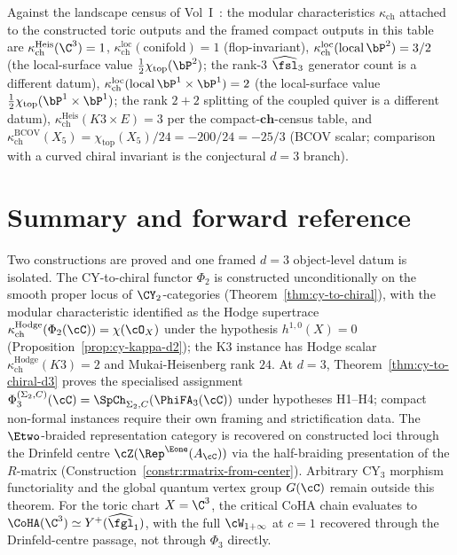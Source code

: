 \begin{remark}
\label{rem:GofX-kappa-consistency}
Against the landscape census of Vol~I~\cite{VolI}: the modular characteristics
$\kappa_{\mathrm{ch}}$ attached to the constructed toric outputs and the
framed compact outputs in this table are
$\kappa_{\mathrm{ch}}^{\mathrm{Heis}}(\C^3) = 1$,
$\kappa_{\mathrm{ch}}^{\mathrm{loc}}(\mathrm{conifold}) = 1$ (flop-invariant),
$\kappa_{\mathrm{ch}}^{\mathrm{loc}}(\mathrm{local}\,\bP^2) = 3/2$ (the local-surface value
$\frac{1}{2}\chi_{\mathrm{top}}(\bP^2)$; the rank-$3$ $\widehat{\fsl}_3$
generator count is a different datum),
$\kappa_{\mathrm{ch}}^{\mathrm{loc}}(\mathrm{local}\,\bP^1 \times \bP^1) = 2$
(the local-surface value
$\frac{1}{2}\chi_{\mathrm{top}}(\bP^1\times\bP^1)$; the rank
$2+2$ splitting of the coupled quiver is a different datum),
$\kappa_{\mathrm{ch}}^{\mathrm{Heis}}(K3 \times E) = 3$ per
the compact-$\mathbf{ch}$-census table, and
$\kappa_{\mathrm{ch}}^{\mathrm{BCOV}}(X_5) = \chi_{\mathrm{top}}(X_5)/24
= -200/24 = -25/3$ (BCOV scalar; comparison with a curved chiral invariant is the conjectural $d=3$ branch).
\end{remark}

\section{Summary and forward reference}
\label{sec:cy-to-chiral-closing}

Two constructions are proved and one framed $d = 3$ object-level datum is isolated. The CY-to-chiral functor $\Phi_2$ is constructed unconditionally on the smooth proper locus of $\CY_2$-categories \textup{(}Theorem~\ref{thm:cy-to-chiral}\textup{),} with the modular characteristic identified as the Hodge supertrace $\kappa_{\mathrm{ch}}^{\mathrm{Hodge}}(\Phi_2(\cC)) = \chi(\cO_X)$ under the hypothesis $h^{1,0}(X) = 0$ \textup{(}Proposition~\ref{prop:cy-kappa-d2}\textup{);} the K3 instance has Hodge scalar $\kappa_{\mathrm{ch}}^{\mathrm{Hodge}}(K3) = 2$ and Mukai-Heisenberg rank $24$. At $d = 3$, Theorem~\ref{thm:cy-to-chiral-d3} proves the specialised assignment $\Phi_3^{(\Sigma_2,C)}(\cC)=\SpCh_{\Sigma_2,C}(\PhiFA_3(\cC))$ under hypotheses \textup{H1--H4}; compact non-formal instances require their own framing and strictification data. The $\Etwo$-braided representation category is recovered on constructed loci through the Drinfeld centre $\cZ(\Rep^{\Eone}(A_\cC))$ via the half-braiding presentation of the $R$-matrix \textup{(}Construction~\ref{constr:rmatrix-from-center}\textup{).} Arbitrary CY$_3$ morphism functoriality and the global quantum vertex group $G(\cC)$ remain outside this theorem. For the toric chart $X=\C^3$, the critical CoHA chain evaluates to $\CoHA(\C^3) \simeq Y^+(\widehat{\fgl}_1)$, with the full $\cW_{1+\infty}$ at $c = 1$ recovered through the Drinfeld-centre passage, not through $\Phi_3$ directly.

